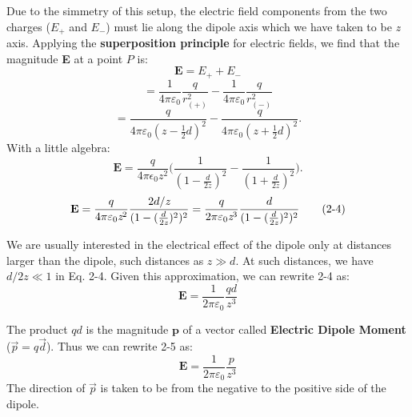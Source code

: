 \documentclass[12pt, a4paper]{article}
\begin{document}
		Due to the simmetry of this setup, the electric field components from the two charges ($E_{+}$ and $E_{-}$) must lie along the dipole axis which we have taken to be \textit{z} axis. Applying the \textbf{superposition principle} for electric fields, we find that the magnitude \textbf{E} at a point $P$ is: 
		\begin{equation*}
			\textbf{E} = E_{+} + E_{-}
		\end{equation*}
		\begin{equation*}
			= \frac{1}{4\pi \varepsilon_0} \frac{q}{r^2_{(+)}} - \frac{1}{4\pi \varepsilon_0} \frac{q}{r^2_{(-)}}
		\end{equation*}
		\begin{equation*}
			= \frac{q}{4\pi \varepsilon_0(\textit{z}-\frac{1}{2}d)^2} - \frac{q}{4\pi \varepsilon_0(\textit{z}+\frac{1}{2}d)^2}.
		\end{equation*}
		With a little algebra:
		\begin{equation*}
			\textbf{E} = \frac{q}{4\pi\epsilon_0\textit{z}^2}\biggl(\frac{1}{(1-\frac{d}{2\textit{z}})^2 } - 
			\frac{1}{(1+\frac{d}{2\textit{z}})^2 }\biggl).
		\end{equation*}
		\begin{equation*}
			\textbf{E} = 
			\frac{q}{4\pi \varepsilon_0\textit{z}^2} 
			\frac{2d/ \textit{z}}{\small(1-(\frac{d}{2\textit{z}})^2)^2}
			= \frac{q}{2\pi \varepsilon_0\textit{z}^3} 
			  \frac{d}{ (1 - (\frac{d}{2\textit{z}})^2)^2 }
			  \tag{2-4}
		\end{equation*}
	
		We are usually interested in the electrical effect of the dipole only at distances larger than the dipole, such distances as $\textit{z} \gg d$.
		At such distances, we have $d/2\textit{z} \ll 1$ in Eq. 2-4. Given this approximation, we can rewrite 2-4 as:
		\begin{equation*}
			\textbf{E} = \frac{1}{2\pi\varepsilon_0} \frac{qd}{\textit{z}^3}
			\tag{2-5}
		\end{equation*}
		
		The product $qd$ is the magnitude $\textbf{p}$ of a vector called  \textbf{Electric Dipole Moment} ($\vec{p} = q\vec{d}$). Thus we can rewrite 2-5 as:
		\begin{equation*}
			\textbf{E} = \frac{1}{2\pi\varepsilon_0} \frac{p}{\textit{z}^3}
			\tag{Electric Dipole, 2-6}
		\end{equation*}
		The direction of $\vec{p}$ is taken to be from the negative to the positive side of the dipole.
		
\end{document}
